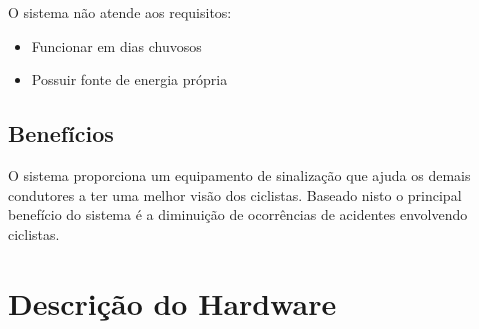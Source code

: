 \documentclass[conference]{IEEEtran}
\begin{document}
O sistema não atende aos requisitos:
\begin{itemize}
  \item Funcionar em dias chuvosos
  \item Possuir fonte de energia própria
\end{itemize}

\subsection{Benefícios}
O sistema proporciona um equipamento de sinalização que ajuda os demais condutores
a ter uma melhor visão dos ciclistas. Baseado nisto o principal benefício do sistema
é a diminuição de ocorrências de acidentes envolvendo ciclistas.


\section{Descrição do Hardware}
\end{document}
